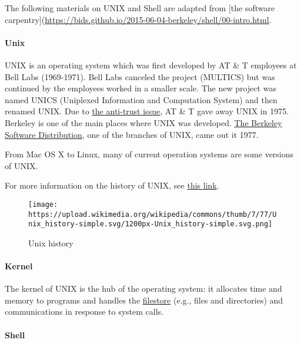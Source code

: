 \documentclass[
]{book}
\begin{document}
The following materials on UNIX and Shell are adapted from {[}the software carpentry{]}(\url{https://bids.github.io/2015-06-04-berkeley/shell/00-intro.html}.

\hypertarget{unix}{%
\paragraph{Unix}\label{unix}}

UNIX is an operating system which was first developed by AT \& T employees at Bell Labs (1969-1971). Bell Labs canceled the project (MULTICS) but was continued by the employees worked in a smaller scale. The new project was named UNICS (Uniplexed Information and Computation System) and then renamed UNIX. Due to \href{https://en.wikipedia.org/wiki/Breakup_of_the_Bell_System}{the anti-trust issue}, AT \& T gave away UNIX in 1975. Berkeley is one of the main places where UNIX was developed. \href{https://en.wikipedia.org/wiki/Berkeley_Software_Distribution}{The Berkeley Software Distribution}, one of the branches of UNIX, came out it 1977.

From Mac OS X to Linux, many of current operation systems are some versions of UNIX.

For more information on the history of UNIX, see \href{https://docs.google.com/presentation/d/1kKt9V6rom55hU6SJ2_3nGluobjtScptlnJV9YFe6Jz4/pub?start=false\&loop=false\&delayms=3000\&slide=id.g163c5ae2ce_0_17}{this link}.

\begin{figure}
\centering
\texttt{[image: https://upload.wikimedia.org/wikipedia/commons/thumb/7/77/Unix\_history-simple.svg/1200px-Unix\_history-simple.svg.png]}
\caption{Unix history}
\end{figure}

\hypertarget{kernel}{%
\paragraph{Kernel}\label{kernel}}

The kernel of UNIX is the hub of the operating system: it allocates time and memory to programs and handles the \href{http://users.ox.ac.uk/~martinw/unix/chap3.html}{filestore} (e.g., files and directories) and communications in response to system calls.

\hypertarget{shell}{%
\paragraph{Shell}\label{shell}}
\end{document}
